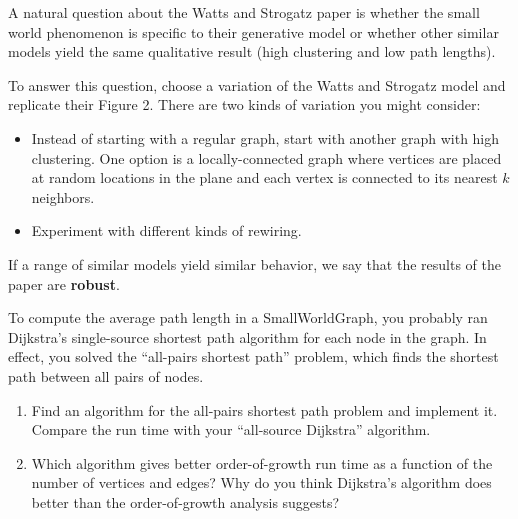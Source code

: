\documentclass[10pt]{book}
\begin{document}
\begin{ex}

A natural question about the Watts and Strogatz paper is
whether the small world phenomenon is specific to their
generative model or whether other similar models yield
the same qualitative result (high clustering and low path lengths).

To answer this question, choose a variation of the
Watts and Strogatz model and replicate their Figure 2.
There are two kinds of variation you might consider:

\begin{itemize}

\item Instead of starting with a regular graph, start with
another graph with high clustering.  One option is a locally-connected
graph where vertices are placed at random locations in the plane
and each vertex is connected to its nearest $k$ neighbors.

\item Experiment with different kinds of rewiring.

\end{itemize}

If a range of similar models yield similar behavior, we
say that the results of the paper are {\bf robust}.

\end{ex}


\begin{ex}

To compute the average path length in a SmallWorldGraph, you
probably ran Dijkstra's single-source shortest path algorithm
for each node in the graph.  In effect, you solved the
``all-pairs shortest path'' problem, which finds the shortest path
between all pairs of nodes.

\begin{enumerate}

\item Find an algorithm for the all-pairs shortest path problem
and implement it.  Compare the run time with your
``all-source Dijkstra'' algorithm.

\item Which algorithm gives better order-of-growth run time
as a function of the number of vertices and edges?  Why do you
think Dijkstra's algorithm does better than the order-of-growth
analysis suggests?

\end{enumerate}

\end{ex}
\end{document}
